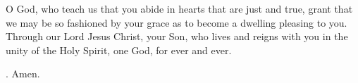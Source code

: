 \lettrine[lines=3]{O}{} God, who teach us that you abide
in hearts that are just and true,
grant that we may be so fashioned by your grace
as to become a dwelling pleasing to you.
Through our Lord Jesus Christ, your Son,
who lives and reigns with you in the unity of the Holy Spirit,
one God, for ever and ever. \par \Rbar. Amen.
